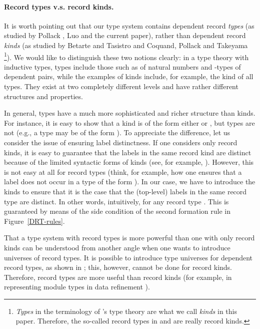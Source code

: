 \documentclass[submission,copyright,creativecommons]{eptcs}
\newcommand{\eg}{{e.g.}}
\begin{document}
\paragraph{Record types v.s. record kinds.}  It is worth pointing out that our type system contains dependent record \emph{types} (as studied by Pollack \cite{Pollack:records02}, Luo \cite{luo:TYPES08,luo:MLPA09} and the current paper), rather than dependent record \emph{kinds} (as studied by Betarte and Tasistro \cite{bet-tar:subtyping98} and Coquand, Pollack and Takeyama \cite{ctp:semantic-records05}\footnote{\emph{Types} in the terminology of \ML's type theory are what we call \emph{kinds} in this paper.  Therefore, the so-called record types in \cite{bet-tar:subtyping98} and \cite{ctp:semantic-records05} are really record kinds.}).  We would like to distinguish these two notions clearly: in a type theory with inductive types, types include those such as  of natural numbers and -types of dependent pairs, while the examples of kinds include, for example, the kind  of all types.  They exist at two completely different levels and have rather different structures and properties.

In general, types have a much more sophisticated and richer structure than kinds.  For instance, it is easy to show that a kind is of the form either  or , but types are not (\eg, a type may be of the form ).  To appreciate the difference, let us consider the issue of ensuring label distinctness.  If one considers only record kinds, it is easy to guarantee that the labels in the same record kind are distinct because of the limited syntactic forms of kinds (see, for example, \cite{ctp:semantic-records05}).  However, this is not easy at all for record types (think, for example, how one ensures that a label does not occur in a type of the form ).  In our case, we have to introduce the kinds  to ensure that it is the case that the (top-level) labels in the same record type are distinct.  In other words, intuitively,  for any record type .  This is guaranteed by means of the side condition  of the second formation rule in Figure~\ref{DRT-rules}.

That a type system with record types is more powerful than one with only record kinds can be understood from another angle when one wants to introduce universes of record types.  It is possible to introduce type universes for dependent record types, as shown in \cite{luo:MLPA09}; this, however, cannot be done for record kinds.  Therefore, record types are more useful than record kinds (for example, in representing module types in data refinement \cite{luo:MLPA09}).
\end{document}
